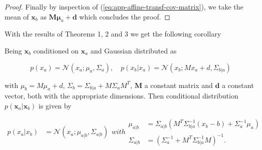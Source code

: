 \begin{appendices}
\begin{proof}
    Finally by inspection of (\ref{eq:app-affine-transf-cov-matrix}), we take the mean of $\mathbf{x}_b$ as $\mathbf{M} \boldsymbol{\mu}_{a}+\mathbf{d}$ which concludes the proof.
  \end{proof}

  With the results of Theorems 1, 2 and 3 we get the following corollary

  \begin{corollary}

    Being $\mathbf{x}_b$ conditioned on $\mathbf{x}_a$ and Gaussian distributed as

    \begin{equation}
      p\left(x_{a}\right)=\mathcal{N}\left(x_{a} ; \mu_{a}, \Sigma_{a}\right), \quad p\left(x_{b} | x_{a}\right)=\mathcal{N}\left(x_{b} ; M x_{a}+d, \Sigma_{b | a}\right)
    \end{equation}

    with $\mu_{b} =M \mu_{a}+d$, $\Sigma_{b} =\Sigma_{b | a}+M \Sigma_{a} M^{T}$, $\mathbf{M}$ a constant matrix and $\mathbf{d}$ a constant vector, both with the appropriate dimensions. Then conditional distribution $p(\mathbf{x}_a|\mathbf{x}_b)$ is given by

    \begin{subequations}
    
    \begin{align}
      p\left(x_{a} | x_{b}\right)&=\mathcal{N}\left(x_{a} ; \mu_{a | b}, \Sigma_{a | b}\right)
    \end{align}
    with
    \begin{align}
        \mu_{a | b}&=\Sigma_{a | b}\left(M^{T} \Sigma_{b | a}^{-1}\left(x_{b}-b\right)+\Sigma_{a}^{-1} \mu_{a}\right) \\ \Sigma_{a | b}&=\left(\Sigma_{a}^{-1}+M^{T} \Sigma_{b | a}^{-1} M\right)^{-1}.
    \end{align}
  \end{subequations}
  \end{corollary}

\end{appendices}